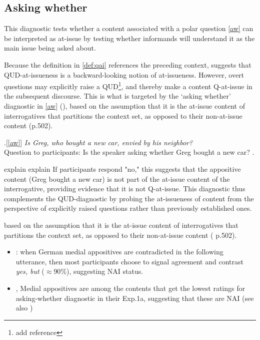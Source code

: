 \documentclass[times,linguex,xcolor]{glossa}
\begin{document}
  \subsection{Asking whether}
    This diagnostic tests whether a content associated with a polar question \ref{aw} can be interpreted as at-issue by testing whether informands will understand it as the main issue being asked about.

    Because the definition in \ref{def:qai} references the preceding context, \citet{koev_notions_2018} suggests that QUD-at-issueness is a backward-looking notion of at-issueness. However, overt questions may explicitly raise a QUD\footnote{add reference}, and thereby make a content Q-at-issue in the subsequent discourse. This is what is targeted by the `asking whether' diagnostic in \ref{aw} (\citealt{tonhauser_how_2018}), based on the assumption that it is the at-issue content of interrogatives that partitions the context set, as opposed to their non-at-issue content (p.502).

    \ex.[\ref{aw}]%
        \emph{Is Greg, who bought a new car, envied by his neighbor?}\smallskip
    \\ Question to participants: Is the speaker asking whether Greg bought a new car?
    \z.

    explain explain
    If participants respond "no," this suggests that the appositive content (Greg bought a new car) is not part of the at-issue content of the interrogative, providing evidence that it is not Q-at-issue. This diagnostic thus complements the QUD-diagnostic by probing the at-issueness of content from the perspective of explicitly raised questions rather than previously established ones.

    based on the assumption that it is the at-issue content of interrogatives that partitions the context set, as opposed to their non-at-issue content (\citealt{tonhauser_how_2018} p.502).


    \begin{itemize}

      \item \citealt{destruel_cross-linguistic_2015}: when German medial appositives are contradicted in the following utterance, then most participants choose to signal agreement and contrast \emph{yes, but} ($\approx 90\%$), suggesting NAI status.

      \item \citealt{tonhauser_how_2018}, Medial appositives are among the contents that get the lowest ratings for asking-whether diagnostic in their Exp.1a, suggesting that these are NAI (see also \citealt{solstad_cataphoric_2024})
    \end{itemize}
  
\end{document}
